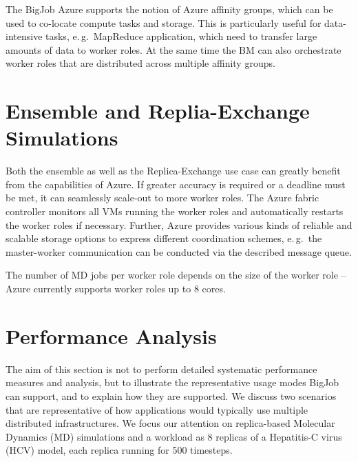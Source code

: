 \documentclass[conference,final]{IEEEtran}
\newcommand{\numrep}{8 }
\newcommand{\alnote}[1]{ {\textcolor{blue} { ***AL: #1 }}}
\newcommand{\alnote}[1]{}
\begin{document}
The BigJob Azure supports the notion of Azure affinity groups, which can be used
to co-locate compute tasks and storage. This is particularly useful for data-intensive
tasks, e.\,g.\ MapReduce application, which need to transfer large amounts of data
to worker roles. At the same time the BM can also orchestrate worker roles that are distributed
across multiple affinity groups.





\section{Ensemble and Replia-Exchange Simulations}

Both the ensemble as well as the Replica-Exchange use case 
can greatly benefit from the capabilities of Azure. If greater 
accuracy is required or a deadline
must be met, it can seamlessly scale-out to more worker roles.  The
Azure fabric controller monitors all VMs running the worker roles and
automatically restarts the worker roles if necessary. Further, Azure
provides various kinds of reliable and scalable storage options to
express different coordination schemes, e.\,g.\ the master-worker
communication can be conducted via the described message queue.


The number of
MD jobs per worker role depends on the size of the worker role --
Azure currently supports worker roles up to 8 cores.


\section{Performance Analysis}
\label{sec:performance}

The aim of this section is not to perform detailed systematic
performance measures and analysis, but to illustrate the
representative usage modes BigJob can support, and to explain how they
are supported.  We discuss two scenarios that are representative of
how applications would typically use multiple distributed
infrastructures. We focus our attention on replica-based Molecular Dynamics (MD)
simulations and a workload as \numrep replicas of a Hepatitis-C virus
(HCV) model, each replica running for 500 timesteps.  
\end{document}
